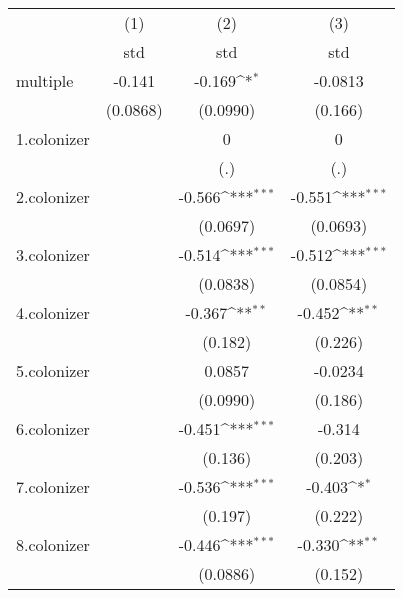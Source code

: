 {
\def\sym#1{\ifmmode^{#1}\else\(^{#1}\)\fi}
\begin{tabular}{l*{3}{c}}
\hline\hline
            &\multicolumn{1}{c}{(1)}&\multicolumn{1}{c}{(2)}&\multicolumn{1}{c}{(3)}\\
            &\multicolumn{1}{c}{std}&\multicolumn{1}{c}{std}&\multicolumn{1}{c}{std}\\
\hline
multiple    &      -0.141         &      -0.169\sym{*}  &     -0.0813         \\
            &    (0.0868)         &    (0.0990)         &     (0.166)         \\
[1em]
1.colonizer &                     &           0         &           0         \\
            &                     &         (.)         &         (.)         \\
[1em]
2.colonizer &                     &      -0.566\sym{***}&      -0.551\sym{***}\\
            &                     &    (0.0697)         &    (0.0693)         \\
[1em]
3.colonizer &                     &      -0.514\sym{***}&      -0.512\sym{***}\\
            &                     &    (0.0838)         &    (0.0854)         \\
[1em]
4.colonizer &                     &      -0.367\sym{**} &      -0.452\sym{**} \\
            &                     &     (0.182)         &     (0.226)         \\
[1em]
5.colonizer &                     &      0.0857         &     -0.0234         \\
            &                     &    (0.0990)         &     (0.186)         \\
[1em]
6.colonizer &                     &      -0.451\sym{***}&      -0.314         \\
            &                     &     (0.136)         &     (0.203)         \\
[1em]
7.colonizer &                     &      -0.536\sym{***}&      -0.403\sym{*}  \\
            &                     &     (0.197)         &     (0.222)         \\
[1em]
8.colonizer &                     &      -0.446\sym{***}&      -0.330\sym{**} \\
            &                     &    (0.0886)         &     (0.152)         \\

\end{tabular}}
